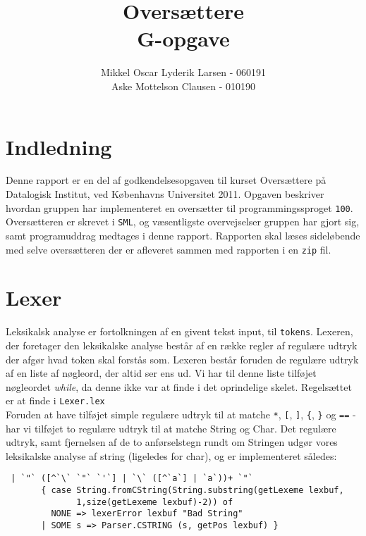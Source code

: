 \documentclass[12pt]{article}
\begin{document}
\author{Mikkel Oscar Lyderik Larsen - 060191 \\ Aske Mottelson Clausen - 010190}
\title{Oversættere \\ G-opgave}
\maketitle

\thispagestyle{empty}
\newpage



\tableofcontents

\section*{Indledning}
Denne rapport er en del af godkendelsesopgaven til kurset Oversættere på Datalogisk Institut, ved Københavns Universitet 2011. Opgaven beskriver hvordan gruppen har implementeret en oversætter til programmingssproget \texttt{100}. Oversætteren er skrevet i \texttt{SML}, og væsentligste overvejselser gruppen har gjort sig, samt programuddrag medtages i denne rapport. Rapporten skal læses sideløbende med selve oversætteren der er afleveret sammen med rapporten i en \texttt{zip} fil.

\section{Lexer}
Leksikalsk analyse er fortolkningen af en givent tekst input, til \texttt{tokens}. Lexeren, der foretager den leksikalske analyse består af en række regler af regulære udtryk der afgør hvad token skal forstås som. Lexeren består foruden de regulære udtryk af en liste af nøgleord, der altid ser ens ud. Vi har til denne liste tilføjet nøgleordet \textit{while}, da denne ikke var at finde i det oprindelige skelet. Regelsættet er at finde i \texttt{Lexer.lex}\\
Foruden at have tilføjet simple regulære udtryk til at matche \texttt{*}, \texttt{[}, \texttt{]}, \texttt{\{}, \texttt{\}} og \texttt{==} - har vi tilføjet to regulære udtryk til at matche String og Char. Det regulære udtryk, samt fjernelsen af de to anførselstegn rundt om Stringen udgør vores leksikalske analyse af string (ligeledes for char), og er implementeret således:\\

\begin{verbatim}
 | `"` ([^`\` `"` `'`] | `\` ([^`a`] | `a`))+ `"`
       { case String.fromCString(String.substring(getLexeme lexbuf,
              1,size(getLexeme lexbuf)-2)) of
         NONE => lexerError lexbuf "Bad String"
       | SOME s => Parser.CSTRING (s, getPos lexbuf) }
\end{verbatim}	 
    
\end{document}
